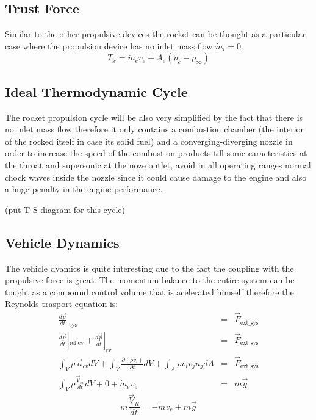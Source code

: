     \subsection{Trust Force}
    Similar to the other propulsive devices the rocket can be thought as a particular case where the propulsion device has no inlet mass flow $\dot{m}_i = 0$.
    \begin{equation}
        \label{rocket_thrust}
        T_x = \dot{m}_e v_e + A_e (p_e - p_\infty)
    \end{equation}
    \subsection{Ideal Thermodynamic Cycle}
    The rocket propulsion cycle will be also very simplified by the fact that there is no inlet mass flow therefore it only contains a combustion chamber (the interior of the rocked itself in case its solid fuel) and a converging-diverging nozzle in order to increase the speed of the combustion products till sonic caracteristics at the throat and supersonic at the noze outlet, avoid in all operating ranges normal chock waves inside the nozzle since it could cause damage to the engine and also a huge penalty in the engine performance. 

    (put T-S diagram for this cycle)         
    

    \subsection{Vehicle Dynamics}
    The vehicle dyamics is quite interesting due to the fact the coupling with the propulsive force is great.
    The momentum balance to the entire system can be tought as a compound control volume that is acelerated himself therefore the Reynolds trasport equation is:  
    \begin{eqnarray}
        \frac{d \vec{p}}{dt}|_{\text{sys}} &=& \vec{F}_{\text{ext\_sys}}\\ 
        \frac{d \vec{p}}{dt}|_{\text{rel\_cv}} + \frac{d \vec{p}}{dt}|_{\text{cv}} &=& \vec{F}_{\text{ext\_sys}}\\ 
        \int_V \rho \, \vec{a}_{cv} dV + \int_V \frac{\partial (\rho v_i)}{\partial t} dV + \int_A \rho v_i v_j n_j dA&=& \vec{F}_{\text{ext\_sys}} \\
        \int_V \rho \frac{\vec{V}_{cv}}{dt} dV + 0 + \dot{m}_e v_e &=& m\vec{g}
    \end{eqnarray} 
    \begin{equation}
        m\frac{\vec{V}_R}{dt} = -\dot{m} v_e  + m\vec{g}
    \end{equation}


